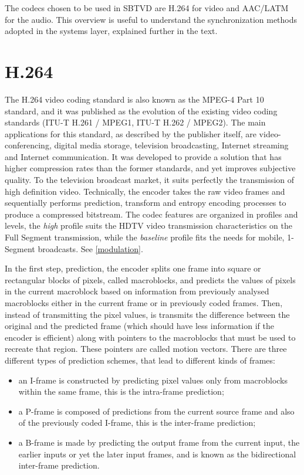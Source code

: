 \documentclass[
	12pt,				%
	openright,			%
	twoside,			%
	a4paper,			%
	brazil,
	french,				%
	english
	]{abntex2}
\begin{document}
The codecs chosen to be used in SBTVD are H.264 for video and AAC/LATM for the audio. This overview is useful to understand the synchronization methods adopted in the systems layer, explained further in the text.

\section{H.264}

The H.264 video coding standard is also known as the MPEG-4 Part 10 standard, and it was published as the evolution of the existing video coding standards (ITU-T H.261 / MPEG1, ITU-T H.262 / MPEG2). The main applications for this standard, as described by the publisher itself, are video-conferencing, digital  media storage, television broadcasting, Internet streaming and Internet communication. It was developed to provide a solution that has higher compression rates than the former standards, and yet improves subjective quality. To the television broadcast market, it suits perfectly the transmission of high definition video. Technically, the encoder takes the raw video frames and sequentially performs prediction, transform and entropy encoding processes to produce a compressed bitstream. The codec features are organized in profiles and levels, the \textit{high} profile suits the HDTV video transmission characteristics on the Full Segment transmission, while the \textit{baseline} profile fits the needs for mobile, 1-Segment broadcasts. See \autoref{modulation}.


In the first step, prediction, the encoder splits one frame into square or rectangular blocks of pixels, called macroblocks, and predicts the values of pixels in the current macroblock based on information from previously analysed macroblocks either in the current frame or in previously coded frames. Then, instead of transmitting the pixel values, is transmits the difference between the original and the predicted frame (which should have less information if the encoder is efficient) along with pointers to the macroblocks that must be used to recreate that region. These pointers are called motion vectors. There are three different types of prediction schemes, that lead to different kinds of frames:

\begin{itemize}
\item{an I-frame is constructed by predicting pixel values only from macroblocks within the same frame, this is the intra-frame prediction;}
\item{a P-frame is composed of predictions from the current source frame and also of the previously coded I-frame, this is the inter-frame prediction;}
\item{a B-frame is made by predicting the output frame from the current input, the earlier inputs or yet the later input frames, and is known as the bidirectional inter-frame prediction.}
\end{itemize}
\end{document}
